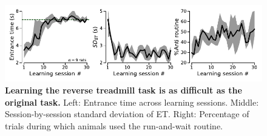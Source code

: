 \begin{figure}[h!]
  \begin{center}
	\includegraphics[width=1\linewidth]{Figures/RevTrdLearning.pdf}
	\caption
	{\textbf{Learning the reverse treadmill task is as difficult as the original task.}
	Left: Entrance time across learning sessions.
	Middle: Session-by-session standard deviation of ET.
	Right: Percentage of trials during which animals used the run-and-wait routine.
	}
	\label{sfig6}
  \end{center}
\end{figure}